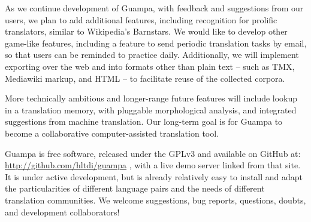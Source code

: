 \documentclass[10pt, a4paper]{article}
\begin{document}
As we continue development of Guampa, with feedback and suggestions from our
users, we plan to add additional features, including recognition for prolific
translators, similar to Wikipedia's Barnstars. We would like to develop other
game-like features, including a feature to send periodic translation tasks by
email, so that users can be reminded to practice daily. Additionally, we will
implement exporting over the web and into formats other than plain text -- such
as TMX, Mediawiki markup, and HTML --  to facilitate reuse of the collected
corpora.

More technically ambitious and longer-range future features will include lookup
in a translation memory, with pluggable morphological analysis, and integrated
suggestions from machine translation. Our long-term goal is for Guampa to
become a collaborative computer-assisted translation tool.

Guampa is free software, released under the GPLv3 and available on GitHub at:
\\
\url{http://github.com/hltdi/guampa} , with a live demo server linked from that
site. It is under active development, but is already relatively easy to install
and adapt the particularities of different language pairs and the needs of
different translation communities. We welcome suggestions, bug reports,
questions, doubts, and development collaborators!



\end{document}
